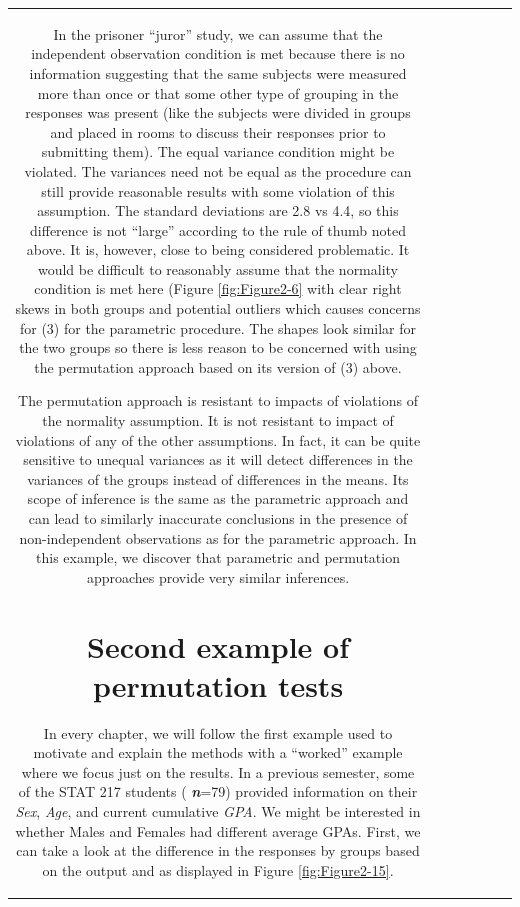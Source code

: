 \documentclass[]{book}
\newenvironment{Shaded}{\begin{snugshade}}{\end{snugshade}}
\theoremstyle{definition}
\theoremstyle{definition}
\theoremstyle{remark}
\begin{document}
\begin{longtable}[]{@{}ccccccc@{}}
\begin{minipage}[b]{0.10\columnwidth}
\begin{Shaded}
\begin{Highlighting}[]
\begin{Shaded}
\begin{Highlighting}[]
In the prisoner ``juror'' study, we can assume that the independent
observation condition is met because there is no information suggesting
that the same subjects were measured more than once or that some other
type of grouping in the responses was present (like the subjects were
divided in groups and placed in rooms to discuss their responses prior
to submitting them). The equal variance condition might be violated. The
variances need not be equal as the procedure can still provide
reasonable results with some violation of this assumption. The standard
deviations are 2.8 vs 4.4, so this difference is not ``large'' according
to the rule of thumb noted above. It is, however, close to being
considered problematic. It would be difficult to reasonably assume that
the normality condition is met here (Figure \ref{fig:Figure2-6} with
clear right skews in both groups and potential outliers which causes
concerns for (3) for the parametric procedure. The shapes look similar
for the two groups so there is less reason to be concerned with using
the permutation approach based on its version of (3) above.

The permutation approach is resistant to impacts of violations of the
normality assumption. It is not resistant to impact of violations of any
of the other assumptions. In fact, it can be quite sensitive to unequal
variances as it will detect differences in the variances of the groups
instead of differences in the means. Its scope of inference is the same
as the parametric approach and can lead to similarly inaccurate
conclusions in the presence of non-independent observations as for the
parametric approach. In this example, we discover that parametric and
permutation approaches provide very similar inferences.

\section{Second example of permutation tests}\label{section2-7}

In every chapter, we will follow the first example used to motivate and
explain the methods with a ``worked'' example where we focus just on the
results. In a previous semester, some of the STAT 217 students (
\textbf{\emph{n}}=79) provided information on their \emph{Sex},
\emph{Age}, and current cumulative \emph{GPA}. We might be interested in
whether Males and Females had different average GPAs. First, we can take
a look at the difference in the responses by groups based on the output
and as displayed in Figure \ref{fig:Figure2-15}.


\end{Highlighting}
\end{Shaded}
\end{Highlighting}
\end{Shaded}
\end{minipage}
\end{longtable}
\end{document}
